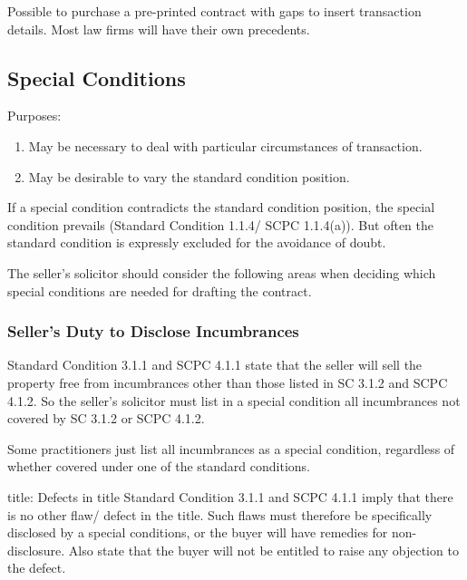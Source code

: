 \documentclass[
]{article}
\newenvironment{Shaded}{}{}
\newcommand{\NormalTok}[1]{#1}
\providecommand{\tightlist}{%
  \setlength{\itemsep}{0pt}\setlength{\parskip}{0pt}}
\begin{document}
Possible to purchase a pre-printed contract with gaps to insert
transaction details. Most law firms will have their own precedents.

\hypertarget{special-conditions}{%
\subsection{Special Conditions}\label{special-conditions}}

Purposes:

\begin{enumerate}
\def\labelenumi{\arabic{enumi}.}
\tightlist
\item
  May be necessary to deal with particular circumstances of transaction.
\item
  May be desirable to vary the standard condition position.
\end{enumerate}

\begin{Shaded}
\begin{Highlighting}[]
\NormalTok{If a special condition contradicts the standard condition position, the special condition prevails (Standard Condition 1.1.4/ SCPC 1.1.4(a)). But often the standard condition is expressly excluded for the avoidance of doubt. }
\end{Highlighting}
\end{Shaded}

The seller's solicitor should consider the following areas when deciding
which special conditions are needed for drafting the contract.

\hypertarget{sellers-duty-to-disclose-incumbrances}{%
\subsubsection{Seller's Duty to Disclose
Incumbrances}\label{sellers-duty-to-disclose-incumbrances}}

Standard Condition 3.1.1 and SCPC 4.1.1 state that the seller will sell
the property free from incumbrances other than those listed in SC 3.1.2
and SCPC 4.1.2. So the seller's solicitor must list in a special
condition all incumbrances not covered by SC 3.1.2 or SCPC 4.1.2.

Some practitioners just list all incumbrances as a special condition,
regardless of whether covered under one of the standard conditions.

\begin{Shaded}
\begin{Highlighting}[]
\NormalTok{title: Defects in title}
\NormalTok{Standard Condition 3.1.1 and SCPC 4.1.1 imply that there is no other flaw/ defect in the title. Such flaws must therefore be specifically disclosed by a special conditions, or the buyer will have remedies for non{-}disclosure. Also state that the buyer will not be entitled to raise any objection to the defect. }
\end{Highlighting}
\end{Shaded}
\end{document}
